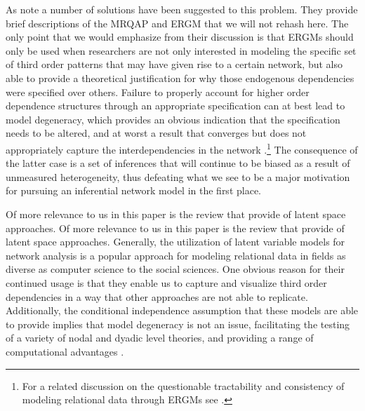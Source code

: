 As \citet{cranmer:etal:2016} note a number of solutions have been suggested to this problem. They provide brief descriptions of the MRQAP and ERGM that we will not rehash here. The only point that we would emphasize from their discussion is that ERGMs should only be used when researchers are not only interested in modeling the specific set of third order patterns that may have given rise to a certain network, but also able to provide a theoretical justification for why those endogenous dependencies were specified over others. Failure to properly account for higher order dependence structures through an appropriate specification can at best lead to model degeneracy, which provides an obvious indication that the specification needs to be altered, and at worst a result that converges but does not appropriately capture the interdependencies in the network \citep{handcock:2003b,hunter:etal:2012}.\footnote{For a related discussion on the questionable tractability and consistency of modeling relational data through ERGMs see \citet{bhamidi:etal:2008,chatterjee:diaconis:2013,chandrasekhar:jackson:2014}.} The consequence of the latter case is a set of inferences that will continue to be biased as a result of unmeasured heterogeneity, thus defeating what we see to be a major motivation for pursuing an inferential network model in the first place. 



Of more relevance to us in this paper is the review that \citet{cranmer:etal:2016} provide of latent space approaches. Of more relevance to us in this paper is the review that \citet{cranmer:etal:2016} provide of latent space approaches. Generally, the utilization of latent variable models for network analysis is a popular approach for modeling relational data in fields as diverse as computer science to the social sciences. One obvious reason for their continued usage is that they enable us to capture and visualize third order dependencies in a way that other approaches are not able to replicate. Additionally, the conditional independence assumption that these models are able to provide implies that model degeneracy is not an issue, facilitating the testing of a variety of nodal and dyadic level theories, and providing a range of computational advantages \citep{hunter:etal:2012}. 

